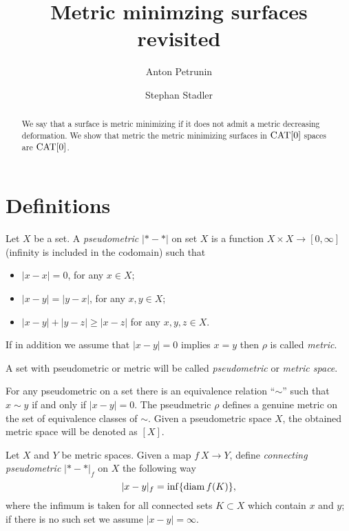 \documentclass[a4paper,10pt]{amsart}
\begin{document}
\title{Metric minimzing surfaces revisited}
\author{Anton Petrunin}
\address{A. Petrunin\newline\vskip-4mm
Math. Dept. PSU,
University Park, PA 16802,
USA}
\author{Stephan Stadler}


\date{}

\begin{abstract}
We say that a surface is metric minimizing if it does not admit a metric decreasing deformation.
We show that metric the metric minimizing surfaces in $\mathop{\rm CAT}\nolimits[0]$ spaces are $\mathop{\rm CAT}\nolimits[0]$.
\end{abstract}
\maketitle



\section{Definitions}

Let $X$ be a set.
A \emph{pseudometric} $|{*}-{*}|$ on set $X$ 
is a function $X\times X\to[0,\infty]$ (infinity is included in the codomain)
such that 
\begin{itemize}
\item $|x-x|=0$, for any $x\in X$;
\item $|x-y|=|y-x|$, for any $x,y\in X$;
\item $|x-y|+|y-z|\ge|x-z|$ for any  $x,y,z\in X$.
\end{itemize}

If in addition we assume that $|x-y|=0$ implies $x=y$ then $\rho$ is called \emph{metric}.


A set with pseudometric or metric will be called \emph{pseudometric} or \emph{metric space}.

For any pseudometric on a set 
there is an equivalence relation ``$\sim$''
such that $x\sim y$ if and only if $|x-y|=0$.
The pseudmetric $\rho$ defines a genuine metric on the set of equivalence classes of $\sim$.
Given a pseudometric space $X$,
the obtained metric space will be denoted as $[X]$.

Let $X$ and $Y$ be metric spaces.
Given a map $f\:X\to Y$,
define \emph{connecting pseudometric} $|{*}-{*}|_f$ on $X$ 
the following way
\[|x-y|_f=\inf\{\mathop{\rm diam}\nolimits f(K)\},\]
where the infimum is taken for all connected sets $K\subset X$ which contain $x$ and $y$;
if there is no such set we assume $|x-y|=\infty$.
\end{document}
